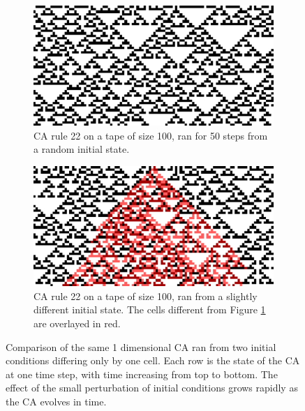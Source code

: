 \begin{figure}[htbp]
\begin{subfigure}[t]{.04\linewidth}
    \caption*{}
  \end{subfigure}
  \begin{subfigure}[t]{.45\linewidth}
    \centering
    \includegraphics[width=.93\linewidth]{figures/ca_comp_a}
    \caption{\ac{CA} rule 22 on a tape of size 100, ran for 50 steps from a
      random initial state.}
    \label{fig:ca_comp_a}
  \end{subfigure}
  \hspace{10pt}
  \begin{subfigure}[t]{.45\linewidth}
    \centering
    \includegraphics[width=.93\linewidth]{figures/ca_comp_b}
    \caption{\ac{CA} rule 22 on a tape of size 100, ran from a slightly
      different initial state. The cells different from Figure \ref{fig:ca_comp_a} are
      overlayed in red.}
    \label{fig:ca_comp_b}
  \end{subfigure}

  \caption{Comparison of the same 1 dimensional \ac{CA} ran from two initial conditions
    differing only by one cell. Each row is the state of the \ac{CA} at one time
    step, with time increasing from top to bottom. The effect of the small perturbation 
    of initial conditions grows rapidly as the \ac{CA} evolves in time.}
  \label{fig:ca_comp}
\end{figure}


